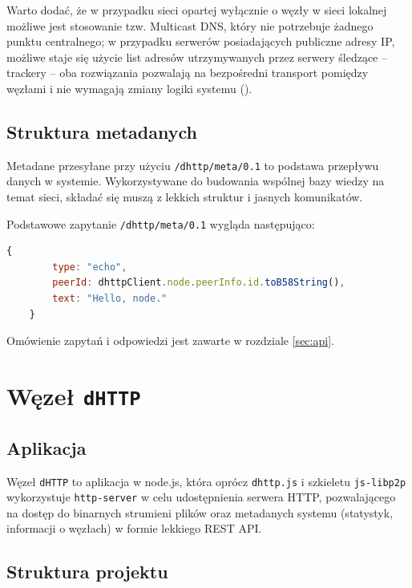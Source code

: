 Warto dodać, że w przypadku sieci opartej wyłącznie o węzły w sieci lokalnej możliwe jest stosowanie tzw. Multicast DNS, który nie potrzebuje żadnego punktu centralnego; w przypadku serwerów posiadających publiczne adresy IP, możliwe staje się użycie list adresów utrzymywanych przez serwery śledzące -- trackery -- oba rozwiązania pozwalają na bezpośredni transport pomiędzy węzłami i nie wymagają zmiany logiki systemu (\cite{discoverylibp2p}).

\subsection{Struktura metadanych}
\label{sub:metadata}

Metadane przesyłane przy użyciu \texttt{/dhttp/meta/0.1} to podstawa przepływu danych w systemie. Wykorzystywane do budowania wspólnej bazy wiedzy na temat sieci, składać się muszą z lekkich struktur i jasnych komunikatów.

Podstawowe zapytanie \texttt{/dhttp/meta/0.1} wygląda następująco:

\begin{lstlisting}[language=javascript]
    {
        type: "echo",
        peerId: dhttpClient.node.peerInfo.id.toB58String(),
        text: "Hello, node."
    }
\end{lstlisting}

Omówienie zapytań i odpowiedzi jest zawarte w rozdziale \ref{sec:api}.




\section{Węzeł \texttt{dHTTP}}

\subsection{Aplikacja}

Węzeł \texttt{dHTTP} to aplikacja w node.js, która oprócz \texttt{dhttp.js} i szkieletu \texttt{js-libp2p} wykorzystuje \texttt{http-server} w celu udostępnienia serwera HTTP, pozwalającego na dostęp do binarnych strumieni plików oraz metadanych systemu (statystyk, informacji o węzłach) w formie lekkiego REST API.

\pagebreak
\subsection{Struktura projektu}
\label{sec:transportAlgorithm}


